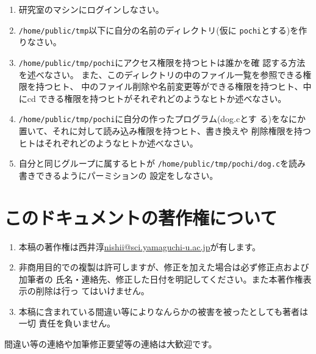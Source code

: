 \documentclass[11pt, twocolumn, ]{jsarticle}
\begin{document}
\begin{enumerate}
\item
  研究室のマシンにログインしなさい。
\item
  \passthrough{\lstinline!/home/public/tmp!}以下に自分の名前のディレクトリ(仮に
  \passthrough{\lstinline!pochi!}とする)を作りなさい。
\item
  \passthrough{\lstinline!/home/public/tmp/pochi!}にアクセス権限を持つヒトは誰かを確
  認する方法を述べなさい。
  また、このディレクトリの中のファイル一覧を参照できる権限を持つヒト、
  中のファイル削除や名前変更等ができる権限を持つヒト、中にcd
  できる権限を持つヒトがそれぞれどのようなヒトか述べなさい。
\item
  \passthrough{\lstinline!/home/public/tmp/pochi!}に自分の作ったプログラム(dog.cとす
  る)をなにか置いて、それに対して読み込み権限を持つヒト、書き換えや
  削除権限を持つヒトはそれぞれどのようなヒトか述べなさい。
\item
  自分と同じグループに属するヒトが
  \passthrough{\lstinline!/home/public/tmp/pochi/dog.c!}を読み書きできるようにパーミションの
  設定をしなさい。
\end{enumerate}

\hypertarget{ux3053ux306eux30c9ux30adux30e5ux30e1ux30f3ux30c8ux306eux8457ux4f5cux6a29ux306bux3064ux3044ux3066}{%
\section{このドキュメントの著作権について}\label{ux3053ux306eux30c9ux30adux30e5ux30e1ux30f3ux30c8ux306eux8457ux4f5cux6a29ux306bux3064ux3044ux3066}}

\begin{enumerate}
\item
  本稿の著作権は西井淳\url{nishii@sci.yamaguchi-u.ac.jp}が有します。
\item
  非商用目的での複製は許可しますが、修正を加えた場合は必ず修正点および加筆者の
  氏名・連絡先、修正した日付を明記してください。また本著作権表示の削除は行っ
  てはいけません。
\item
  本稿に含まれている間違い等によりなんらかの被害を被ったとしても著者は一切
  責任を負いません。
\end{enumerate}

間違い等の連絡や加筆修正要望等の連絡は大歓迎です。
\end{document}
